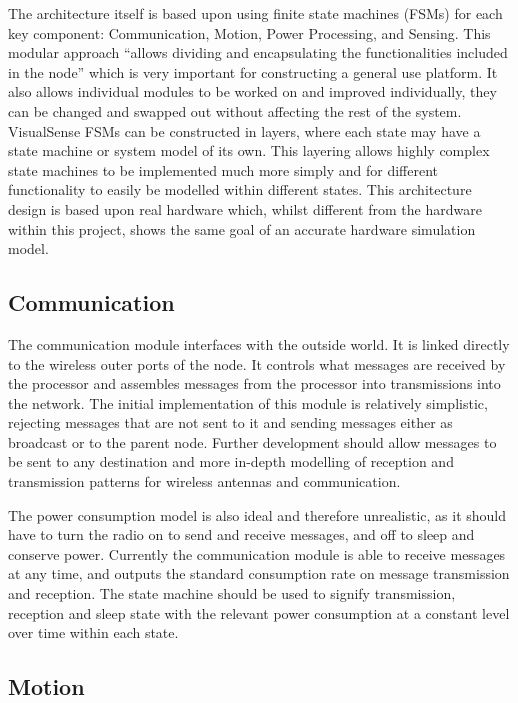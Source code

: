 \documentclass[authoryearcitations]{UoYCSproject}
\begin{document}
The architecture itself is based upon \citet{Rosello2009} using finite state machines (FSMs) for each key component: Communication, Motion, Power Processing, and Sensing. This modular approach ``allows dividing and encapsulating the functionalities included in the node'' which is very important for constructing a general use platform. It also allows individual modules to be worked on and improved individually, they can be changed and swapped out without affecting the rest of the system. VisualSense FSMs can be constructed in layers, where each state may have a state machine or system model of its own. This layering allows highly complex state machines to be implemented much more simply and for different functionality to easily be modelled within different states. This architecture design is based upon real hardware which, whilst different from the hardware within this project, shows the same goal of an accurate hardware simulation model.

\subsection{Communication}

The communication module interfaces with the outside world. It is linked directly to the wireless outer ports of the node. It controls what messages are received by the processor and assembles messages from the processor into transmissions into the network. The initial implementation of this module is relatively simplistic, rejecting messages that are not sent to it and sending messages either as broadcast or to the parent node. Further development should allow messages to be sent to any destination and more in-depth modelling of reception and transmission patterns for wireless antennas and communication.

The power consumption model is also ideal and therefore unrealistic, as it should have to turn the radio on to send and receive messages, and off to sleep and conserve power. Currently the communication module is able to receive messages at any time, and outputs the standard consumption rate on message transmission and reception. The state machine should be used to signify transmission, reception and sleep state with the relevant power consumption at a constant level over time within each state.

\subsection{Motion}
\end{document}
